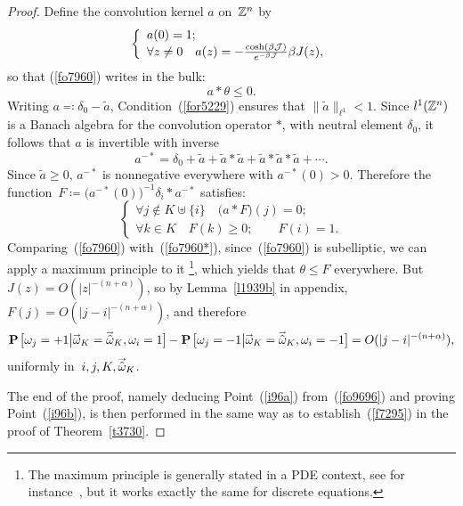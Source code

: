 \begin{proof}
Define the convolution kernel $a$ on~$\mathbb{Z}^n$ by
\[ \left\{ \begin{array}{ll} a(0) = 1 ; \\
\forall z\neq 0 \quad a(z) = - \frac{\cosh(\beta\mcal{J})}{e^{-\beta\mcal{J}}}\beta J(z) ,
\end{array}\right. \]
so that (\ref{fo7960}) writes in the bulk:
\[ a * \theta \leq 0 .\]
%
Writing $a \eqqcolon \delta_0 - \tilde{a}$,
Condition~(\ref{for5229}) ensures that $\|\tilde{a}\|_{\ell^1} < 1$.
Since $l^1(\mathbb{Z}^n)$ is a Banach algebra for the convolution operator $*$,
with neutral element $\delta_{0}$, it follows that $a$ is invertible with inverse
\[\label{fo7178} a^{-*} =
\delta_{0} + \tilde{a} + \tilde{a} * \tilde{a} + \tilde{a} * \tilde{a} * \tilde{a} + \cdots .\]
Since $\tilde{a} \geq 0$, $a^{-*}$ is nonnegative everywhere with $a^{-*}(0)>0$.
Therefore the function~$F \coloneqq \big(a^{-*}(0)\big)^{-1} \delta_i * a^{-*}$
satisfies:
\[\label{fo7960*} \left\{ \begin{array}{ll}
\forall j\notin K\uplus\{i\} \quad \big(a \ast F\big)(j) = 0 ;\\
\forall k\in K \quad F(k) \geq 0; \qquad F(i) = 1.
\end{array}\right.\]
Comparing~(\ref{fo7960}) with~(\ref{fo7960*}),
since~(\ref{fo7960}) is subelliptic,
we can apply a maximum principle to it%
\footnote{The maximum principle is generally stated in a PDE context,
see for instance~\cite[\S~3.1]{elliptique}, but it works exactly the same for discrete equations.},
which yields that $\theta \leq F$ everywhere.
But $J(z) = O(|z|^{-(n+\alpha)})$,
so by Lemma~\ref{l1939b} in appendix, $F(j) = O(|j-i|^{-(n+\alpha)})$,
and therefore
\[\label{fo9696} \Pr\big[ \omega_j=+1 \big| \vec\omega_K = \vechat{\omega}_K , \omega_i = 1 \big]
- \Pr\big[ \omega_j=-1 \big| \vec\omega_K = \vechat{\omega}_K , \omega_i = -1 \big]
= O(|j-i|^{-(n+\alpha)}) ,\]
uniformly in~$i, j, K, \vechat{\omega}_K$.

The end of the proof, namely deducing Point~(\ref{i96a}) from~(\ref{fo9696})
and proving Point~(\ref{i96b}), is then performed in the same way as to establish~(\ref{f7295})
in the proof of Theorem~\ref{t3730}.
\end{proof}

